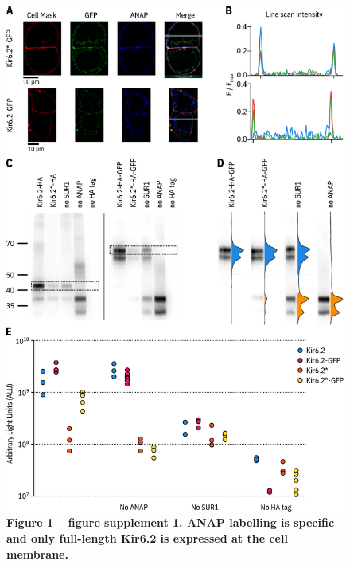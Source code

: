 \documentclass[10pt,lineno, doublespacing]{elife}
\begin{document}
\begin{figure}
\begin{fullwidth}
\centering
\includegraphics[height=0.95\textheight]{figure_one_s1}
\captionsetup{labelformat=empty}
\caption{\textbf{Figure 1 -- figure supplement 1. ANAP labelling is specific and only full-length Kir6.2 is expressed at the cell membrane.}}
\label{fig:one_s1}
\end{fullwidth}
\end{figure}
\end{document}

